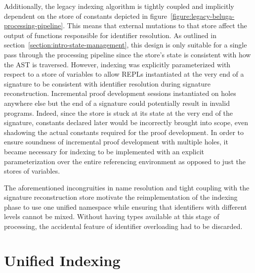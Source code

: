 Additionally, the legacy indexing algorithm is tightly coupled and implicitly dependent on the store of constants depicted in figure~\ref{figure:legacy-beluga-processing-pipeline}.
This means that external mutations to that store affect the output of functions responsible for identifier resolution.
As outlined in section~\ref{section:intro-state-management}, this design is only suitable for a single pass through the processing pipeline since the store's state is consistent with how the \ac{AST} is traversed.
However, indexing was explicitly parameterized with respect to a store of variables to allow \acp{REPL} instantiated at the very end of a \Beluga signature to be consistent with identifier resolution during signature reconstruction.
Incremental proof development sessions instantiated on holes anywhere else but the end of a \Beluga signature could potentially result in invalid programs.
Indeed, since the store is stuck at its state at the very end of the \Beluga signature, constants declared later would be incorrectly brought into scope, even shadowing the actual constants required for the proof development.
In order to ensure soundness of incremental proof development with multiple holes, it became necessary for indexing to be implemented with an explicit parameterization over the entire referencing environment as opposed to just the stores of variables.

The aforementioned incongruities in name resolution and tight coupling with the signature reconstruction store motivate the reimplementation of the indexing phase to use one unified namespace while ensuring that identifiers with different levels cannot be mixed.
Without having types available at this stage of processing, the accidental feature of identifier overloading had to be discarded.

\section{Unified Indexing}\label{section:indexing}



